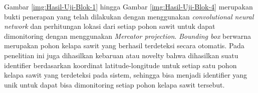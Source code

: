 Gambar \ref{img:Hasil-Uji-Blok-1} hingga Gambar \ref{img:Hasil-Uji-Blok-4} merupakan bukti penerapan yang telah dilakukan dengan menggunakan \textit{convolutional neural network} dan perhitungan lokasi dari setiap pohon sawit untuk dapat dimonitoring dengan menggunakan \textit{Mercator projection}. \textit{Bounding box} berwarna merupakan pohon kelapa sawit yang berhasil terdeteksi secara otomatis. Pada penelitian ini juga dihasilkan kebaruan atau novelty bahwa dihasilkan suatu identifier berdasarkan koordinat latitude-longitude untuk setiap satu pohon kelapa sawit yang terdeteksi pada sistem, sehingga bisa menjadi identifier yang unik untuk dapat bisa dimonitoring setiap pohon kelapa sawit tersebut.